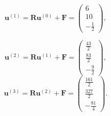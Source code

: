 \documentclass[a4paper]{article}
\begin{document}
\begin{enumerate}
\begin{itemize}
\[
	\mathbf{u}^{(1)}=\mathbf{R}\mathbf{u}^{(0)}+\mathbf{F}=
	\begin{pmatrix} 6 \\ 10 \\ -\frac{1}{2} \end{pmatrix} 
,\] 

\[
	\mathbf{u}^{(2)}=\mathbf{R}\mathbf{u}^{(1)}+\mathbf{F}=
	\begin{pmatrix} \frac{43}{2} \\ \frac{83}{2} \\ -\frac{9}{2} \end{pmatrix} 
,\] 
\[
	\mathbf{u}^{(3)}=\mathbf{R}\mathbf{u}^{(2)}+\mathbf{F}=
	\begin{pmatrix} \frac{161}{2} \\ \frac{327}{2} \\ -\frac{81}{4} \end{pmatrix} 
.\] 
\end{itemize}
\end{enumerate}
\end{document}
